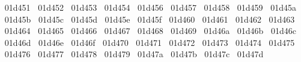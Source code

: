 {  ^^^^^^01d451%
  ^^^^^^01d452%
  ^^^^^^01d453%
  ^^^^^^01d454%
  ^^^^^^01d456%
  ^^^^^^01d457%
  ^^^^^^01d458%
  ^^^^^^01d459%
  ^^^^^^01d45a%
  ^^^^^^01d45b%
  ^^^^^^01d45c%
  ^^^^^^01d45d%
  ^^^^^^01d45e%
  ^^^^^^01d45f%
  ^^^^^^01d460%
  ^^^^^^01d461%
  ^^^^^^01d462%
  ^^^^^^01d463%
  ^^^^^^01d464%
  ^^^^^^01d465%
  ^^^^^^01d466%
  ^^^^^^01d467%
  ^^^^^^01d468%
  ^^^^^^01d469%
  ^^^^^^01d46a%
  ^^^^^^01d46b%
  ^^^^^^01d46c%
  ^^^^^^01d46d%
  ^^^^^^01d46e%
  ^^^^^^01d46f%
  ^^^^^^01d470%
  ^^^^^^01d471%
  ^^^^^^01d472%
  ^^^^^^01d473%
  ^^^^^^01d474%
  ^^^^^^01d475%
  ^^^^^^01d476%
  ^^^^^^01d477%
  ^^^^^^01d478%
  ^^^^^^01d479%
  ^^^^^^01d47a%
  ^^^^^^01d47b%
  ^^^^^^01d47c%
  ^^^^^^01d47d%
}
